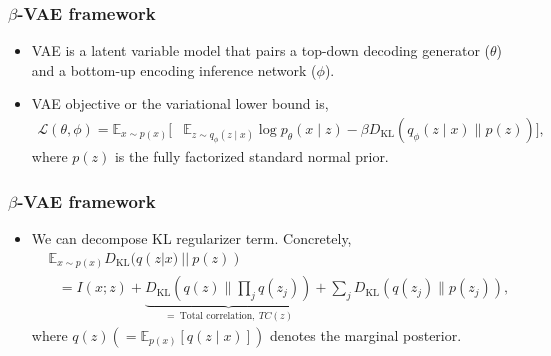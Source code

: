 \documentclass[10pt,mathserif]{beamer}
\begin{document}
\begin{frame}
\frametitle{$\beta$-VAE framework}
\begin{itemize}\itemsep=20pt
\item VAE is a latent variable model that pairs a top-down decoding generator ($\theta$) and a bottom-up encoding inference network ($\phi$).\pause
\item VAE objective or the variational lower bound is,
\begin{align}
\mathcal{L}(\theta,\phi) = \mathbb{E}_{x \sim p(x)} \big[&\mathbb{E}_{z \sim q_\phi(z \mid x)} \log p_\theta(x \mid z)- \beta D_\text{KL}\left(q_\phi(z \mid x) \parallel p(z)\right)\big],\nonumber
\end{align}
where $p(z)$ is the fully factorized standard normal prior.
\end{itemize}
\end{frame}

\begin{frame}
\frametitle{$\beta$-VAE framework}
\begin{itemize}\itemsep=12pt
\item We can decompose KL regularizer term. Concretely,
\begin{align}
&\mathbb{E}_{x \sim p(x)} D_\text{KL}(q(z| x) ~||~ p(z))\nonumber \\
&~~~=I(x;z) + \underbrace{D_\text{KL}(q(z) \parallel \prod_j q(z_j))}_{=~\text{Total correlation},~ TC(z)} + \sum_j D_\text{KL}(q(z_j) \parallel p(z_j)),\nonumber
\end{align}
        where $q(z)(=\mathbb{E}_{p(x)}[q(z\!\mid\!x)])$ denotes the marginal posterior. 
\end{itemize}
\end{frame}
\end{document}
